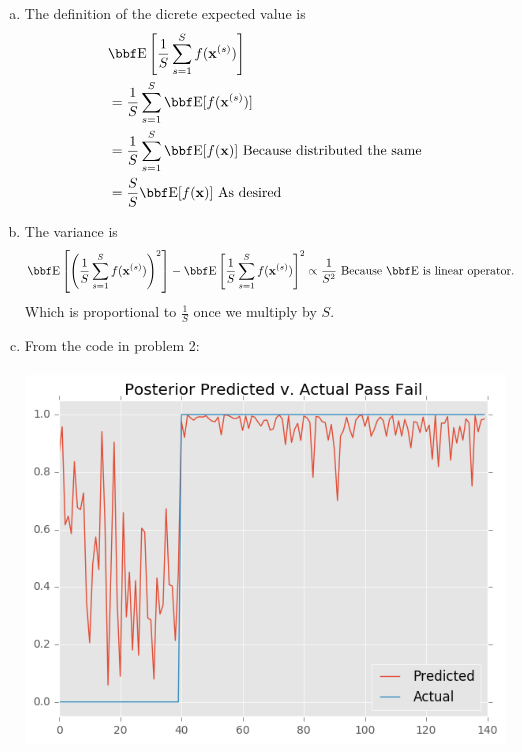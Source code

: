 \documentclass[12pt,letterpaper,fleqn]{hmcpset}
\begin{document}
\begin{solution}
	\begin{enumerate}[(a)]
		\item 
			The definition of the dicrete expected value is
			\begin{align*}
				& \EE \left[\frac1S \sum_{s=1}^S f(\xx^{(s)}) \right] \\
				&= \frac1S \sum_{s=1}^S \EE [f(\xx^{(s)})] \\
				&= \frac1S \sum_{s=1}^S \EE [f(\xx)] \text{ Because distributed the same} \\
				&= \frac{S}{S} \EE [f(\xx)] \text{ As desired}
			\end{align*}
		\item
			The variance is 
			\begin{align*}
				\EE \left[ \left(\frac1S \sum_{s=1}^S f(\xx^{(s)})\right)^2 \right]- \EE \left[\frac1S \sum_{s=1}^S f(\xx^{(s)}) \right]^2
				&\propto \frac{1}{S^2} \text{ Because $\EE$ is linear operator.}
			\end{align*}
			Which is proportional to $\frac1S$ once we multiply by $S$.

		\item
			From the code in problem 2:\\\\
			\includegraphics[scale = 1]{pred.png}
	\end{enumerate}
\end{solution}
\end{document}

